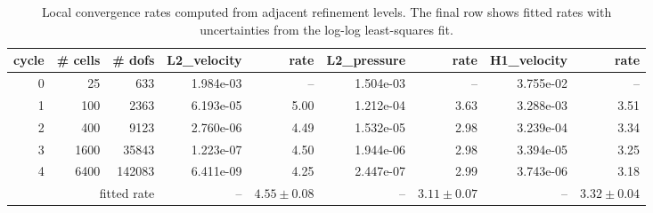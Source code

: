\begin{table}[htbp]
\centering
\begin{tabular}{|r|r|r|r|r|r|r|r|r|}
\hline
cycle & \# cells & \# dofs & L2\_velocity & rate & L2\_pressure & rate & H1\_velocity & rate \\ \hline
0 & 25 & 633 & 1.984e-03 & -- & 1.504e-03 & -- & 3.755e-02 & -- \\ \hline
1 & 100 & 2363 & 6.193e-05 & 5.00 & 1.212e-04 & 3.63 & 3.288e-03 & 3.51 \\ \hline
2 & 400 & 9123 & 2.760e-06 & 4.49 & 1.532e-05 & 2.98 & 3.239e-04 & 3.34 \\ \hline
3 & 1600 & 35843 & 1.223e-07 & 4.50 & 1.944e-06 & 2.98 & 3.394e-05 & 3.25 \\ \hline
4 & 6400 & 142083 & 6.411e-09 & 4.25 & 2.447e-07 & 2.99 & 3.743e-06 & 3.18 \\ \hline
\multicolumn{3}{|r|}{fitted rate} & -- & $4.55 \pm 0.08$ & -- & $3.11 \pm 0.07$ & -- & $3.32 \pm 0.04$ \\ \hline
\end{tabular}
\caption{Local convergence rates computed from adjacent refinement levels. The final row shows fitted rates with uncertainties from the log-log least-squares fit.}
\end{table}
